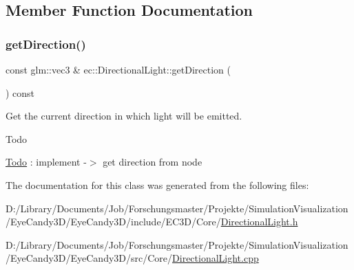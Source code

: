 \subsection{Member Function Documentation}
\mbox{\label{classec_1_1_directional_light_af7bdf6f7576f38b48a8b6aa7301ef04e}} 
\subsubsection{\texorpdfstring{get\+Direction()}{getDirection()}}
{\footnotesize\ttfamily const glm\+::vec3 \& ec\+::\+Directional\+Light\+::get\+Direction (\begin{DoxyParamCaption}{ }\end{DoxyParamCaption}) const}



Get the current direction in which light will be emitted. 

\begin{DoxyRefDesc}{Todo}
\item[\mbox{\hyperlink{todo__todo000007}{Todo}}]\+: implement -\/$>$ get direction from node \end{DoxyRefDesc}


The documentation for this class was generated from the following files\+:\begin{DoxyCompactItemize}
\item 
D\+:/\+Library/\+Documents/\+Job/\+Forschungsmaster/\+Projekte/\+Simulation\+Visualization/\+Eye\+Candy3\+D/\+Eye\+Candy3\+D/include/\+E\+C3\+D/\+Core/\mbox{\hyperlink{_directional_light_8h}{Directional\+Light.\+h}}\item 
D\+:/\+Library/\+Documents/\+Job/\+Forschungsmaster/\+Projekte/\+Simulation\+Visualization/\+Eye\+Candy3\+D/\+Eye\+Candy3\+D/src/\+Core/\mbox{\hyperlink{_directional_light_8cpp}{Directional\+Light.\+cpp}}\end{DoxyCompactItemize}
